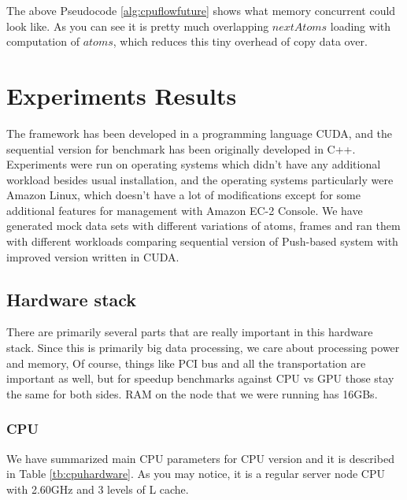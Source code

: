 \documentclass[12pt,letterpaper]{report}
\begin{document}
\vspace{1cm}

The above Pseudocode \ref{alg:cpuflowfuture} shows what memory concurrent could look like. As you can see it is pretty much overlapping $nextAtoms$ loading with computation of $atoms$, which reduces this tiny overhead of copy data over.



\chapter{Experiments Results}\label{sc:experiments}

\hspace{3em} The framework has been developed in a programming language CUDA, and the sequential version for benchmark\cite{mainPaper} has been originally developed in C++. Experiments were run on operating systems which didn't have any additional workload besides usual installation, and the operating systems particularly were Amazon Linux, which doesn't have a lot of modifications except for some additional features for management with Amazon EC-2 Console. We have generated mock data sets with different variations of atoms, frames and ran them with different workloads comparing sequential version of Push-based system with improved version written in CUDA.



\section{Hardware stack}

\hspace{3em} There are primarily several parts that are really important in this hardware stack. Since this is primarily big data processing, we care about processing power and memory, Of course, things like PCI bus and all the transportation are important as well, but for speedup benchmarks against CPU vs GPU those stay the same for both sides. RAM on the node that we were running has 16GBs. 

\subsection{CPU}
\hspace{3em} We have summarized main CPU parameters for CPU version and it is described in Table \ref{tb:cpuhardware}. As you may notice, it is a regular server node CPU with 2.60GHz and 3 levels of L cache.
\end{document}

